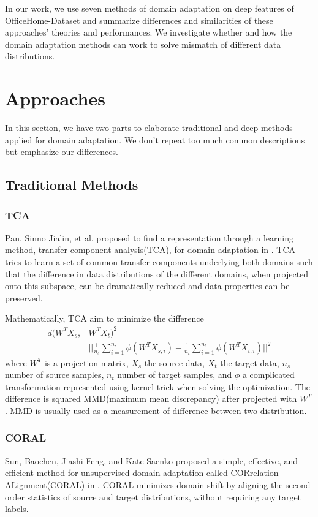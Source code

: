 \documentclass[conference]{IEEEtran}
\begin{document}
In our work, we use seven methods of domain adaptation on deep features of OfficeHome-Dataset and summarize differences and similarities of these approaches' theories and performances. We investigate whether and how the domain adaptation methods can work to solve mismatch of different data distributions.
\section{Approaches}
In this section, we have two parts to elaborate traditional and deep methods applied for domain adaptation. We don't repeat too much common descriptions but emphasize our differences.

\subsection{Traditional Methods}
\subsubsection{TCA}
Pan, Sinno Jialin, et al. proposed to find a representation through a learning method, transfer component analysis(TCA), for domain adaptation in \cite{TCA}. TCA tries to learn a set of common transfer components underlying both domains such that the difference in data distributions of the different domains, when projected onto this subspace, can be dramatically reduced and data properties can be preserved.

Mathematically, TCA aim to minimize the difference
\begin{equation}
    \begin{aligned}
      d(W^TX_s,& W^TX_t)^2 =   \\
            &||\frac{1}{n_s} \sum\limits_{i=1}^{n_s} \phi(W^TX_{s,i}) - \frac{1}{n_t} \sum\limits_{i=1}^{n_t} \phi(W^TX_{t,i})||^2
    \end{aligned}
\end{equation}
where $W^T$ is a projection matrix, $X_s$ the source data, $X_t$ the target data, $n_s$ number of source samples, $n_t$ number of target samples, and $\phi$ a complicated transformation represented using kernel trick when solving the optimization. The difference is squared MMD(maximum mean discrepancy) after projected with $W^T$. MMD is usually used as a measurement of difference between two distribution.

\subsubsection{CORAL}
Sun, Baochen, Jiashi Feng, and Kate Saenko proposed a simple, effective, and efficient method for unsupervised domain adaptation called CORrelation ALignment(CORAL) in \cite{CORAL}. CORAL minimizes domain shift by aligning the second-order statistics of source and target distributions, without requiring any target labels.
\end{document}
